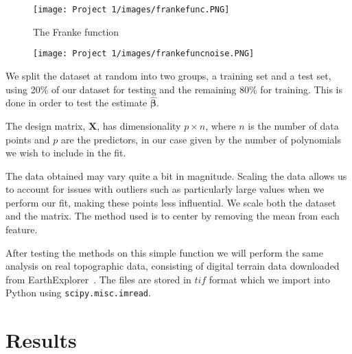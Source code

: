 \documentclass[reprint,english,notitlepage]{revtex4-1}  %
\begin{document}
\begin{figure}[h!]
    \centering %
    \texttt{[image: Project 1/images/frankefunc.PNG]} %
    \caption{The Franke function }
    \label{fig: ff}
\end{figure}
\begin{figure}[h!]
    \centering %
    \texttt{[image: Project 1/images/frankefuncnoise.PNG]} %
    \caption{}
    \label{fig: ffn}
\end{figure}

We split the dataset at random into two groups, a training set and a test set, using 20\% of our dataset for testing and the remaining 80\% for training. This is done in order to test the estimate $\boldsymbol{\hat{\beta}}$. 

The design matrix, $\mathbf{X}$, has dimensionality $p\times n$, where $n$ is the number of data points and $p$ are the predictors, in our case given by the number of polynomials we wish to include in the fit. 

The data obtained may vary quite a bit in magnitude. Scaling the data allows us to account for issues with outliers such as particularly large values when we perform our fit, making these points less influential. 
We scale both the dataset and the matrix. The method used is to center by removing the mean from each feature. 

After testing the methods on this simple function we will perform the same analysis on real topographic data, consisting of digital terrain data downloaded from EarthExplorer~\cite{terrain}. The files are stored in $tif$ format which we import into Python using {\lstinline[language={[python]TeX},basicstyle=\ttfamily]|scipy.misc.imread|}. 















\section{Results}\label{sec:results}
\end{document}

